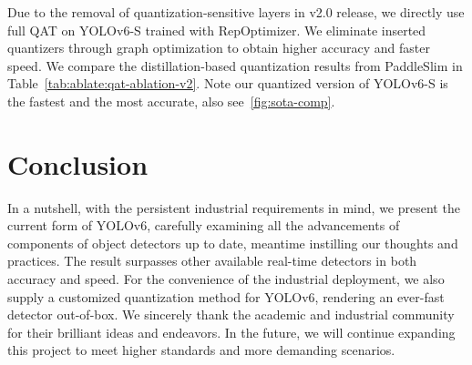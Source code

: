 \documentclass[10pt,twocolumn,letterpaper]{article}
\begin{document}
 
Due to the removal of quantization-sensitive layers in v2.0 release, we directly use full QAT on YOLOv6-S trained with RepOptimizer. We eliminate inserted quantizers through graph optimization to obtain higher accuracy and faster speed. We compare the distillation-based quantization results from PaddleSlim\cite{baidu2022paddleslim}  in Table~\ref{tab:ablate:qat-ablation-v2}. Note our quantized version of YOLOv6-S is the fastest and the most accurate, also see~\cref{fig:sota-comp}.
 
 \begin{table}[ht]
    \begin{center}
    \end{center}
    \caption{QAT performance of YOLOv6-S (v2.0) compared with other quantized detectors. `': based on v1.0 release. `': We tested with TensorRT 8 on Tesla T4 with a batch size of 1 and 32.}
    \label{tab:ablate:qat-ablation-v2}
  \end{table}
  
 
             

\section{Conclusion}
In a nutshell, with the persistent industrial requirements in mind, we present the current form of YOLOv6, carefully examining all the advancements of components of object detectors up to date, meantime instilling our thoughts and practices. The result surpasses other available real-time detectors in both accuracy and speed. For the convenience of the industrial deployment, we also supply a customized quantization method for YOLOv6, rendering an ever-fast detector out-of-box. We sincerely thank the academic and industrial community for their brilliant ideas and endeavors. In the future, we will continue expanding this project to meet higher standards and more demanding scenarios. 
{\small


}
\end{document}
